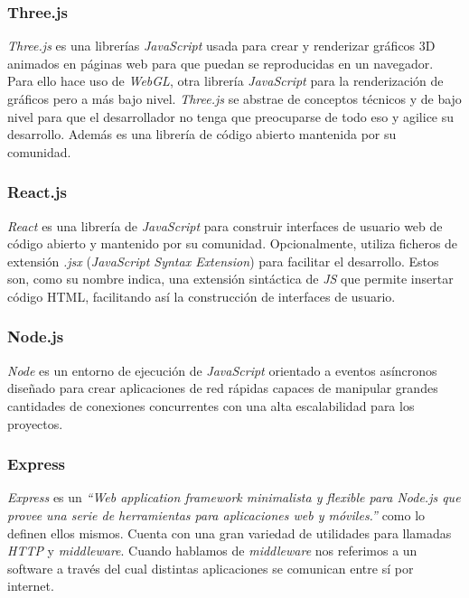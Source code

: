 \subsubsection*{Three.js}
\textit{Three.js}\cite{three} es una librerías \textit{JavaScript} usada para crear y renderizar gráficos 3D animados en páginas web para que puedan se reproducidas en un navegador. Para ello hace uso de \textit{WebGL}, otra librería \textit{JavaScript} para la renderización de gráficos pero a más bajo nivel. \textit{Three.js} se abstrae de conceptos técnicos y de bajo nivel para que el desarrollador no tenga que preocuparse de todo eso y agilice su desarrollo. Además es una librería de código abierto mantenida por su comunidad.

\subsubsection*{React.js}
\textit{React}\cite{react} es una librería de \textit{JavaScript} para construir interfaces de usuario web de código abierto y mantenido por su comunidad. Opcionalmente, utiliza ficheros de extensión \textit{.jsx} (\textit{JavaScript Syntax Extension}) para facilitar el desarrollo. Estos son, como su nombre indica, una extensión sintáctica de \textit{JS} que permite insertar código HTML, facilitando así la construcción de interfaces de usuario.

\subsubsection*{Node.js}
\textit{Node}\cite{nodejs} es un entorno de ejecución de \textit{JavaScript} orientado a eventos asíncronos diseñado para crear aplicaciones de red rápidas capaces de manipular grandes cantidades de conexiones concurrentes con una alta escalabilidad para los proyectos.

\subsubsection*{Express}
\textit{Express}\cite{express} es un \textit{``Web application framework minimalista y flexible para Node.js que provee una serie de herramientas para aplicaciones web y móviles.''} como lo definen ellos mismos. Cuenta con una gran variedad de utilidades para llamadas \textit{HTTP} y \textit{middleware}. Cuando hablamos de \textit{middleware} nos referimos a un software a través del cual distintas aplicaciones se comunican entre sí por internet. 

